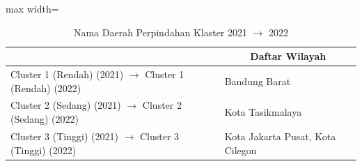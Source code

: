\begin{table}[H]
\centering
\caption{Nama Daerah Perpindahan Klaster 2021 \(\rightarrow\) 2022} \label{tab:sample2transname2021x2022}
\begin{adjustbox}{max width=\textwidth}
\begin{tabular}{|>{\centering\arraybackslash}p{4cm}|p{10cm}|}
\hline
\multicolumn{1}{|c|}{\textbf{Kategori}} & \multicolumn{1}{c|}{\textbf{Daftar Wilayah}} \\
\hline
Cluster 1 (Rendah) (2021) \(\rightarrow\) Cluster 1 (Rendah) (2022) & Bandung Barat \\
\hline
Cluster 2 (Sedang) (2021) \(\rightarrow\) Cluster 2 (Sedang) (2022) & Kota Tasikmalaya \\
\hline
Cluster 3 (Tinggi) (2021) \(\rightarrow\) Cluster 3 (Tinggi) (2022) & Kota Jakarta Pusat, Kota Cilegon \\
\hline
\end{tabular}
\end{adjustbox}
\end{table}